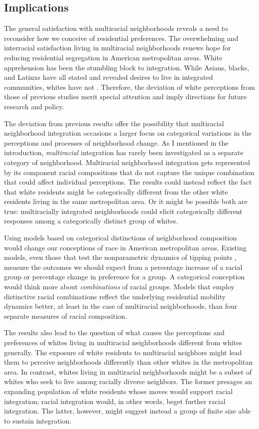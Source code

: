 \documentclass{baderart}
\begin{document}
\subsection{Implications}
The general satisfaction with multiracial neighborhoods reveals a need to reconsider how we conceive of residential preferences. The overwhelming and interracial satisfaction living in multiracial neighborhoods renews hope for reducing residential segregation in American metropolitan areas. White apprehension has been the stumbling block to integration. While Asians, blacks, and Latinxs have all stated and revealed desires to live in integrated communities, whites have not \citep{charles_neighborhood_2000}. Therefore, the deviation of white perceptions from those of previous studies merit special attention and imply directions for future research and policy. 

The deviation from previous results offer the possibility that multiracial neighborhood integration occasions a larger focus on categorical variations in the perceptions and processes of neighborhood change. As I mentioned in the introduction, \emph{multiracial} integration has rarely been investigated as a separate category of neighborhood. Multiracial neighborhood integration gets represented by its component racial compositions that do not capture the unique combination that could affect individual perceptions. The results could instead reflect the fact that white residents might be categorically different from the other white residents living in the same metropolitan area. Or it might be possible both are true: multiracially integrated neighborhoods could elicit categorically different responses among a categorically distinct group of whites. 

Using models based on categorical distinctions of neighborhood composition would change our conceptions of race in American metropolitan areas. Existing models, even those that test the nonparametric dynamics of tipping points \citep[e.g.,][]{schelling_dynamic_1971, bruch_neighborhood_2006, xie_modeling_2012}, measure the outcomes we should expect from a percentage increase of a racial group or percentage change in preference for a group. A categorical conception would think more about \emph{combinations} of racial groups. Models that employ distinctive racial combinations reflect the underlying residential mobility dynamics better, at least in the case of multiracial neighborhoods, than four separate measures of racial composition. 

The results also lead to the question of what causes the perceptions and preferences of whites living in multiracial neighborhoods different from whites generally. The exposure of white residents to multiracial neighbors might lead them to perceive neighborhoods differently than other whites in the metropolitan area. In contrast, whites living in multiracial neighborhoods might be a subset of whites who seek to live among racially diverse neighbors. The former presages an expanding population of white residents whose moves would support racial integration; racial integration would, in other words, beget further racial integration. The latter, however, might suggest instead a group of finite size able to sustain integration. 
\end{document}

